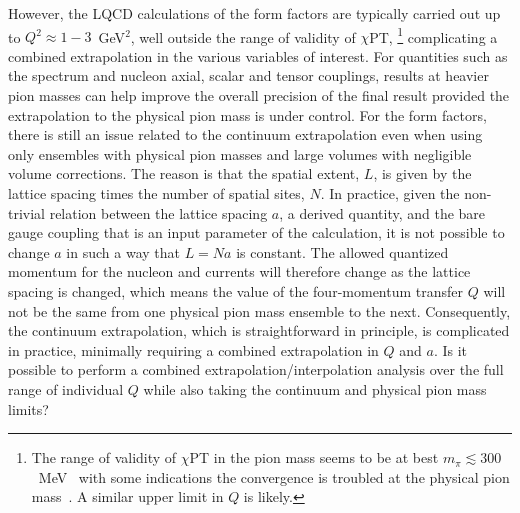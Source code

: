 \documentclass{ar-1col}
\begin{document}
However, the LQCD calculations of the form factors are typically carried out up to $Q^2\approx1-3$~GeV$^2$, well outside the range of validity of $\chi$PT,%
\footnote{The range of validity of $\chi$PT in the pion mass seems to be at best $m_\pi\lesssim300$~MeV~\cite{Beane:2004ks,Walker-Loud:2008rui} with some indications the convergence is troubled at the physical pion mass~\cite{Walker-Loud:2019cif,Drischler:2019xuo}.  A similar upper limit in $Q$ is likely.}
complicating a combined extrapolation in the various variables of interest.
For quantities such as the spectrum and nucleon axial, scalar and tensor couplings, results at heavier pion masses can help improve the overall precision of the final result provided the extrapolation to the physical pion mass is under control.
For the form factors,
 there is still an issue related to the continuum extrapolation even when using only ensembles with physical pion masses and large volumes with negligible volume corrections.
The reason is that the spatial extent, $L$, is given by the lattice spacing times
 the number of spatial sites, $N$.
In practice, given the non-trivial relation between the lattice spacing $a$, a derived quantity, and the bare gauge coupling that is an input parameter of the calculation, it is not possible to change $a$ in such a way that $L = N a$ is constant.
The allowed quantized momentum for the nucleon and currents will therefore change as the lattice spacing is changed, which means the value of the four-momentum transfer $Q$ will not be the same from one physical pion mass ensemble to the next.
Consequently, the continuum extrapolation, which is straightforward in principle, is complicated in practice, minimally requiring a combined extrapolation in $Q$ and $a$.
Is it possible to perform a combined extrapolation/interpolation analysis over the full range of individual $Q$ while also taking the continuum and physical pion mass limits?
\end{document}
